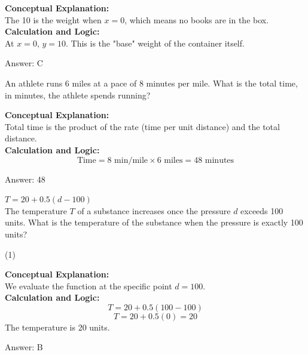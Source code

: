 \documentclass[11pt,paper=a4,answers]{exam}
\begin{document}
\begin{questions}
\begin{solution}
\textbf{Conceptual Explanation:} \\
The 10 is the weight when $x=0$, which means no books are in the box.
\\[10pt]
\textbf{Calculation and Logic:} \\
At $x = 0$, $y = 10$. This is the "base" weight of the container itself.

\vspace{15pt}
Answer: \colorbox{yellow!100}{C}
\end{solution}

\question
An athlete runs 6 miles at a pace of 8 minutes per mile. What is the total time, in minutes, the athlete spends running?

\begin{solution}
\textbf{Conceptual Explanation:} \\
Total time is the product of the rate (time per unit distance) and the total distance.
\\[10pt]
\textbf{Calculation and Logic:} \\
\[\text{Time} = 8 \text{ min/mile} \times 6 \text{ miles} = 48 \text{ minutes}\]

\vspace{15pt}
Answer: \colorbox{yellow!100}{48}
\end{solution}

\question
$T = 20 + 0.5(d - 100)$ \\
The temperature $T$ of a substance increases once the pressure $d$ exceeds 100 units. What is the temperature of the substance when the pressure is exactly 100 units?
\begin{tasks}(1)
\end{tasks}

\begin{solution}
\textbf{Conceptual Explanation:} \\
We evaluate the function at the specific point $d = 100$.
\\[10pt]
\textbf{Calculation and Logic:} \\
\[T = 20 + 0.5(100 - 100)\]
\[T = 20 + 0.5(0) = 20\]
The temperature is 20 units.

\vspace{15pt}
Answer: \colorbox{yellow!100}{B}
\end{solution}


\end{questions}
\end{document}
